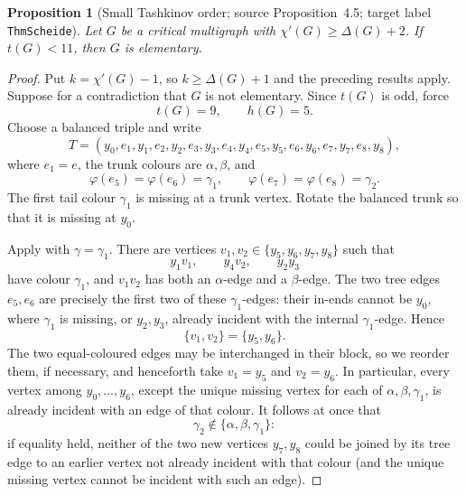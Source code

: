\documentclass[11pt]{article}
\newtheorem{proposition}[proposition]{Proposition}
\theoremstyle{definition}
\newcommand{\set}[1]{\{#1\}}
\newcommand{\target}[1]{\texttt{#1}}
\begin{document}
\begin{proposition}[Small Tashkinov order; source Proposition~4.5;
 target label \target{ThmScheide}]
\label{Scheide-Proposition-4.5}\label{ThmScheide}
Let $G$ be a critical multigraph with $\chi'(G)\ge\Delta(G)+2$. If
$t(G)<11$, then $G$ is elementary.
\end{proposition}

\begin{proof}
Put $k=\chi'(G)-1$, so $k\ge\Delta(G)+1$ and the preceding results apply.
Suppose for a contradiction that $G$ is not elementary. Since $t(G)$ is
odd,  force
\[
 t(G)=9,
 \qquad
 h(G)=5.
\]
Choose a balanced triple and write
\[
 T=(y_0,e_1,y_1,e_2,y_2,e_3,y_3,e_4,y_4,
     e_5,y_5,e_6,y_6,e_7,y_7,e_8,y_8),
\]
where $e_1=e$, the trunk colours are $\alpha,\beta$, and
\[
 \varphi(e_5)=\varphi(e_6)=\gamma_1,
 \qquad
 \varphi(e_7)=\varphi(e_8)=\gamma_2.
\]
The first tail colour $\gamma_1$ is missing at a trunk vertex. Rotate the
balanced trunk so that it is missing at $y_0$.

Apply  with $\gamma=\gamma_1$. There are vertices
$v_1,v_2\in\set{y_5,y_6,y_7,y_8}$ such that
\[
 y_1v_1,\qquad y_4v_2,
 \qquad y_2y_3
\]
have colour $\gamma_1$, and $v_1v_2$ has both an $\alpha$-edge and a
$\beta$-edge. The two tree edges $e_5,e_6$ are precisely the first two of
these $\gamma_1$-edges: their in-ends cannot be $y_0$, where
$\gamma_1$ is missing, or $y_2,y_3$, already incident with the internal
$\gamma_1$-edge. Hence
\[
 \set{v_1,v_2}=\set{y_5,y_6}.
\]
The two equal-coloured edges may be interchanged in their block, so we
reorder them, if necessary, and henceforth take $v_1=y_5$ and $v_2=y_6$.
In particular, every vertex among $y_0,\ldots,y_6$, except the unique
missing vertex for each of $\alpha,\beta,\gamma_1$, is already incident
with an edge of that colour. It follows at once that
\[
 \gamma_2\notin\set{\alpha,\beta,\gamma_1}:
\]
if equality held, neither of the two new vertices $y_7,y_8$ could be
joined by its tree edge to an earlier vertex not already incident with that
colour (and the unique missing vertex cannot be incident with such an
edge).


\end{proof}
\end{document}

